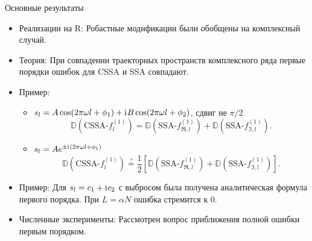 \documentclass[10pt, ucs, notheorems, handout]{beamer}
\newcommand{\iu}{\mathrm{i}\mkern1mu}
\begin{document}
\begin{frame}{Основные результаты}
    \begin{itemize}
    	\item \alert{Реализации на R:} Робастные модификации были обобщены на комплексный случай.
        \item \alert{Теория:} При совпадении траекторных пространств комплексного ряда первые порядки ошибок для CSSA и SSA совпадают.
        \item \alert{Пример:} \begin{itemize}
        	\item $s_l = A\cos(2 \pi\omega l + \phi_1) + \iu B\cos(2 \pi\omega l + \phi_2)$, сдвиг не $\pi / 2$
        	$$\mathbb{D}(\text{CSSA-}f^{(1)}_l) = \mathbb{D}(\text{SSA-}f^{(1)}_{\Re, l}) + \mathbb{D}(\text{SSA-}f^{(1)}_{\Im, l}).$$
        	\item $s_l = Ae^{\pm \iu(2 \pi\omega l + \phi_1)}$
        	$$\mathbb{D}(\text{CSSA-}f^{(1)}_l) \stackrel{?}{=} \frac{1}{2}[\mathbb{D}(\text{SSA-}f^{(1)}_{\Re, l}) + \mathbb{D}(\text{SSA-}f^{(1)}_{\Im, l})].$$
        \end{itemize}
        \item \alert{Пример:} Для $s_l = c_1 + \iu c_2$ с выбросом была получена аналитическая формула первого порядка. При $L = \alpha N$ ошибка стремится к $0$.
        \item \alert{Численные эксперименты:} Рассмотрен вопрос приближения полной ошибки первым порядком.
    \end{itemize}

\end{frame}
\end{document}
